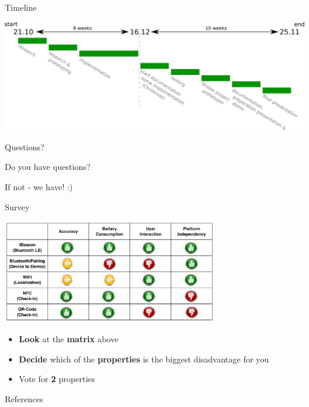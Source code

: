 \documentclass[9pt]{beamer}
\begin{document}
\begin{frame}{Timeline}

	\begin{center}
		
		\includegraphics[width=\textwidth]{Timeline}%

	\end{center}

\end{frame}

\begin{frame}{Questions?}

	\begin{center}

		{\Huge Do you have questions?}
		
		\vspace{1cm}
		
		{\Large If not - we have! :)}
		
	\end{center}

\end{frame}

\begin{frame}{Survey}

	\begin{center}

		\includegraphics[width=0.7\textwidth]{matrix}
		
	\end{center}

	\begin{itemize}
		\setlength{\itemsep}{1ex}
		\item \textbf{Look} at the \textbf{matrix} above
		\item \textbf{Decide} which of the \textbf{properties} is the biggest disadvantage for you
		\item Vote for \textbf{2} properties
	\end{itemize}

\end{frame}


\begin{frame}[allowframebreaks]{References}
	\nocite{*}
	

\end{frame}
\end{document}
